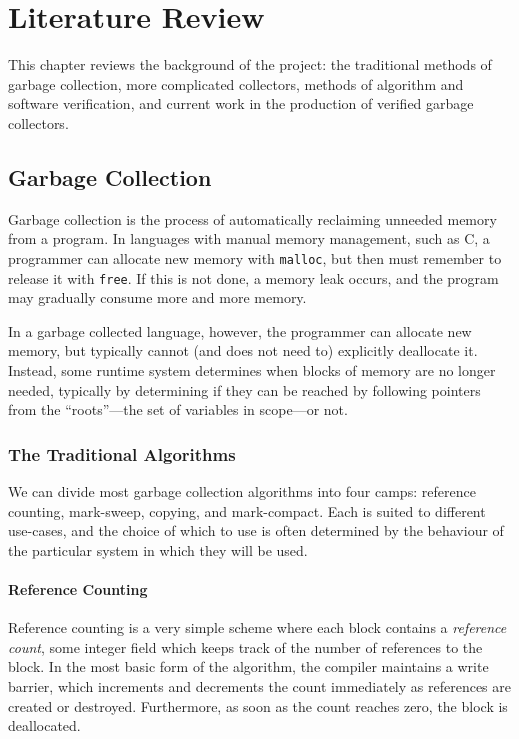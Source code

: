 \chapter{Literature Review}


This chapter reviews the background of the project: the traditional
methods of garbage collection, more complicated collectors, methods of
algorithm and software verification, and current work in the
production of verified garbage collectors.

\section{Garbage Collection}

Garbage collection is the process of automatically reclaiming unneeded
memory from a program. In languages with manual memory management,
such as C, a programmer can allocate new memory with \texttt{malloc},
but then must remember to release it with \texttt{free}. If this is
not done, a memory leak occurs, and the program may gradually consume
more and more memory.

In a garbage collected language, however, the programmer can allocate
new memory, but typically cannot (and does not need to) explicitly
deallocate it. Instead, some runtime system determines when blocks of
memory are no longer needed, typically by determining if they can be
reached by following pointers from the ``roots''---the set of
variables in scope---or not.

\subsection{The Traditional Algorithms}

We can divide most garbage collection algorithms into four camps:
reference counting, mark-sweep, copying, and mark-compact. Each is
suited to different use-cases, and the choice of which to use is often
determined by the behaviour of the particular system in which they
will be used.

\subsubsection{Reference Counting}

Reference counting is a very simple scheme where each block contains a
\textit{reference count}, some integer field which keeps track of the
number of references to the block. In the most basic form of the
algorithm, the compiler maintains a write barrier, which increments
and decrements the count immediately as references are created or
destroyed. Furthermore, as soon as the count reaches zero, the block
is deallocated\cite{Collins60}.

